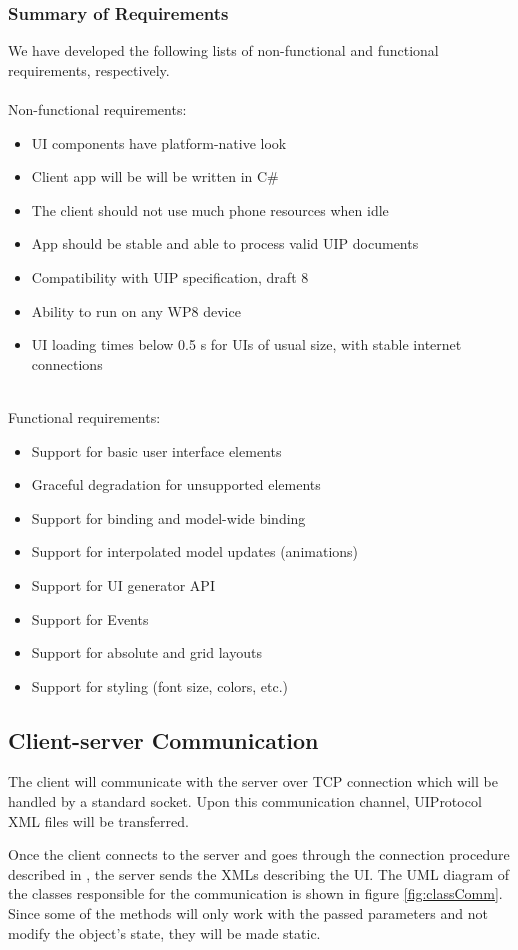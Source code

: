 \subsubsection{Summary of Requirements}
We have developed the following lists of non-functional and functional requirements, respectively.
\\\\
Non-functional requirements:
\begin{itemize}
  \item UI components have platform-native look
  \item Client app will be will be written in C\#
  \item The client should not use much phone resources when idle
  \item App should be stable and able to process valid UIP documents
  \item Compatibility with UIP specification, draft 8
  \item Ability to run on any WP8 device
  \item UI loading times below 0.5 s for UIs of usual size, with stable internet connections
\end{itemize}
~\\
Functional requirements:
\begin{itemize}
  \item  Support for basic user interface elements
  \item Graceful degradation for unsupported elements
  \item  Support for binding and model-wide binding
  \item  Support for interpolated model updates (animations)
  \item  Support for UI generator API
  \item  Support for Events
  \item Support for absolute and grid layouts
  \item Support for styling (font size, colors, etc.)
\end{itemize}

\subsection{Client-server Communication}
The client will communicate with the server over TCP connection which will be handled by a standard socket. Upon this communication channel, UIProtocol XML files will be transferred.

Once the client connects to the server and goes through the connection procedure described in \cite{uip}, the server sends the XMLs describing the UI. The UML diagram of the classes responsible for the communication is shown in figure \ref{fig:classComm}. Since some of the methods will only work with the passed parameters and not modify the object's state, they will be made static. 

